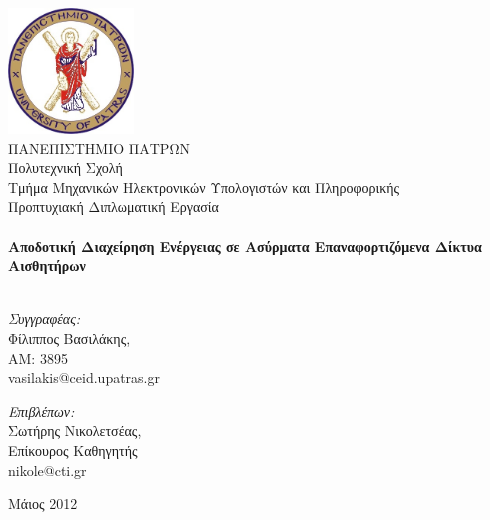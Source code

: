 
\begin{titlingpage}
\begin{center}

\includegraphics[width=0.25\textwidth]{images/upatras_logo.jpg}\\[1cm]

\HUGE 	ΠΑΝΕΠΙΣΤΗΜΙΟ ΠΑΤΡΩΝ\\
\LARGE	Πολυτεχνική Σχολή\\
\Huge	Τμήμα Μηχανικών Ηλεκτρονικών Υπολογιστών και Πληροφορικής\\[1.5cm]

\LARGE Προπτυχιακή Διπλωματική Εργασία\\[0.1cm]


\HRule \\[0.4cm]
{ \HUGE \bfseries Αποδοτική Διαχείρηση Ενέργειας σε Ασύρματα Επαναφορτιζόμενα Δίκτυα Αισθητήρων}\\[0.4cm]

\HRule \\[0.5cm]

\begin{minipage}{0.4\textwidth}
\begin{flushleft} \large
\emph{Συγγραφέας:}\\
Φίλιππος Βασιλάκης, \\AM: 3895\\ vasilakis@ceid.upatras.gr
\end{flushleft}
\end{minipage}
\begin{minipage}{0.4\textwidth}
\begin{flushright} \large
\emph{Επιβλέπων:} \\
Σωτήρης Νικολετσέας, \\Επίκουρος Καθηγητής\\ nikole@cti.gr
\end{flushright}
\end{minipage}

\vfill

{\large Μάιος 2012}

\end{center}

\end{titlingpage}
